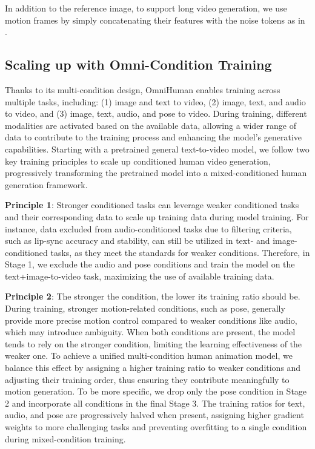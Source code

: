 In addition to the reference image, to support long video generation, we use motion frames \cite{stypulkowski2024diffused} by simply concatenating their features with the noise tokens as in \cite{opensora}.



\subsection{Scaling up with Omni-Condition Training}
\label{sec:method:training}

Thanks to its multi-condition design, OmniHuman enables training across multiple tasks, including: (1) image and text to video, (2) image, text, and audio to video, and (3) image, text, audio, and pose to video. During training, different modalities are activated based on the available data, allowing a wider range of data to contribute to the training process and enhancing the model’s generative capabilities. Starting with a pretrained general text-to-video model, we follow two key training principles to scale up conditioned human video generation, progressively transforming the pretrained model into a mixed-conditioned human generation framework.

\textbf{Principle 1}: Stronger conditioned tasks can leverage weaker conditioned tasks and their corresponding data to scale up training data during model training. For instance, data excluded from audio-conditioned tasks due to filtering criteria, such as lip-sync accuracy and stability, can still be utilized in text- and image-conditioned tasks, as they meet the standards for weaker conditions.
Therefore, in Stage 1, we exclude the audio and pose conditions and train the model on the text+image-to-video task, maximizing the use of available training data.

\textbf{Principle 2}: The stronger the condition, the lower its training ratio should be. During training, stronger motion-related conditions, such as pose, generally provide more precise motion control compared to weaker conditions like audio, which may introduce ambiguity. When both conditions are present, the model tends to rely on the stronger condition, limiting the learning effectiveness of the weaker one.
To achieve a unified multi-condition human animation model, we balance this effect by assigning a higher training ratio to weaker conditions and adjusting their training order, thus ensuring they contribute meaningfully to motion generation.
To be more specific, we drop only the pose condition in Stage 2 and incorporate all conditions in the final Stage 3. The training ratios for text, audio, and pose are progressively halved when present, assigning higher gradient weights to more challenging tasks and preventing overfitting to a single condition during mixed-condition training.

